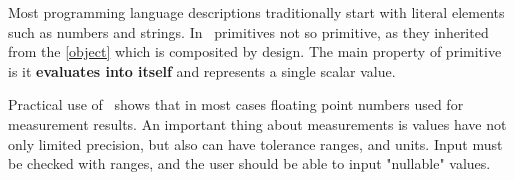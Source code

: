 \clearpage
{}\label{prim}\secdown

Most programming language descriptions traditionally start with literal elements
such as numbers and strings. In \mel\ primitives not so primitive, as they
inherited from the  \ref{object} which is composited by design.
The main property of primitive is it \textbf{evaluates into itself} and
represents a single scalar value.

\bigskip
{}

\clearpage
{}\label{nil}


\label{name}


\clearpage
{}\label{string}


\clearpage
{}\label{number}

Practical use of \mel\ shows that in most cases floating point numbers used for
measurement results. An important thing about measurements is values have not
only limited precision, but also can have tolerance ranges, and units. Input
must be checked with ranges, and the user should be able to input "nullable"
values.


{}

\label{integer}


\secup

